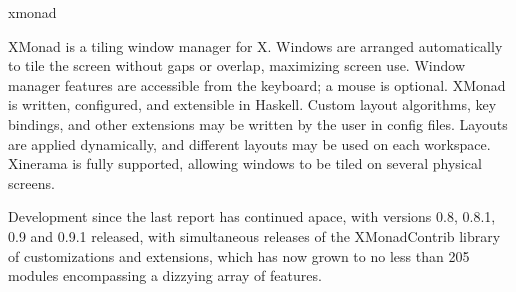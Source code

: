 \begin{hcarentry}{xmonad}
\label{xmonad}
\makeheader

XMonad is a tiling window manager for X. Windows are arranged
automatically to tile the screen without gaps or overlap, maximizing
screen use. Window manager features are accessible from the keyboard; a
mouse is optional. XMonad is written, configured, and extensible in
Haskell. Custom layout algorithms, key bindings, and other extensions may
be written by the user in config files. Layouts are applied
dynamically, and different layouts may be used on each workspace.
Xinerama is fully supported, allowing windows to be tiled on several
physical screens.

Development since the last report has continued apace, with versions
0.8, 0.8.1, 0.9 and 0.9.1 released, with simultaneous releases of the
XMonadContrib library of customizations and extensions, which has now
grown to no less than 205 modules encompassing a dizzying array of features.


\end{hcarentry}
